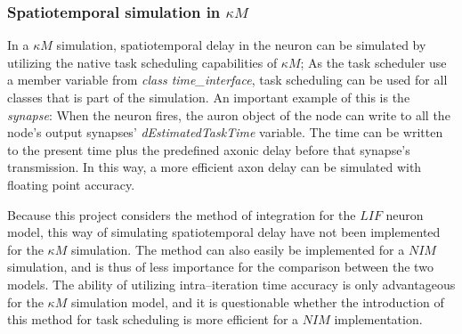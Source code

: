 
			\subsubsection{Spatiotemporal simulation in $\kappa M$}
			In a $\kappa M$ simulation, spatiotemporal delay in the neuron can be simulated by utilizing the native task scheduling capabilities of $\kappa M$;
			As the task scheduler use a member variable from \emph{class time\_interface}, task scheduling can be used for all classes that is part of the simulation.
			An important example of this is the \emph{synapse}: %
				When the neuron fires, the auron object of the node can write to all the node's output synapses' \emph{dEstimatedTaskTime} variable.
			The time can be written to the present time plus the predefined axonic delay before that synapse's transmission.
			In this way, a more efficient axon delay can be simulated with floating point accuracy.

			Because this project considers the method of integration for the $LIF$ neuron model, this way of simulating spatiotemporal delay have not been implemented for the $\kappa M$ simulation.
			The method can also easily be implemented for a $NIM$ simulation, and is thus of less importance for the comparison between the two models.
			The ability of utilizing intra--iteration time accuracy is only advantageous for the $\kappa M$ simulation model, and it is questionable whether the introduction of this method for task scheduling is more efficient for a $NIM$ implementation.
	

